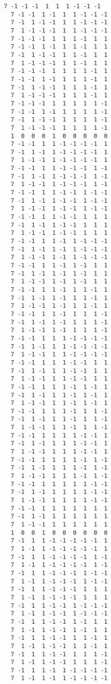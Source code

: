 \documentclass[%
  twocolumn,
 showpacs,
 showkeys,
 preprintnumbers,
 amsmath,amssymb,
 aps,
  pra,
  longbibliography,
 floatfix,
 ]{revtex4-1}
\begin{document}
{\begin{lstlisting}[backgroundcolor=\color{yellow!10},framerule=0pt,breaklines=true, frame=tb]
  7 -1 -1 -1  1  1  1 -1 -1 -1
  7 -1 -1  1 -1  1  1 -1 -1 -1
  7 -1  1 -1 -1  1  1 -1 -1 -1
  7  1 -1 -1 -1  1  1 -1 -1 -1
  7 -1 -1 -1  1  1  1 -1  1  1
  7 -1 -1  1 -1  1  1 -1  1  1
  7 -1  1 -1 -1  1  1 -1  1  1
  7  1 -1 -1 -1  1  1 -1  1  1
  7 -1 -1 -1  1  1  1  1 -1  1
  7 -1 -1  1 -1  1  1  1 -1  1
  7 -1  1 -1 -1  1  1  1 -1  1
  7  1 -1 -1 -1  1  1  1 -1  1
  7 -1 -1 -1  1  1  1  1  1 -1
  7 -1 -1  1 -1  1  1  1  1 -1
  7 -1  1 -1 -1  1  1  1  1 -1
  7  1 -1 -1 -1  1  1  1  1 -1
  1  0  0  0  1  0  0  0  0  0
  7 -1 -1  1  1 -1 -1 -1 -1  1
  7 -1  1 -1  1 -1 -1 -1 -1  1
  7  1 -1 -1  1 -1 -1 -1 -1  1
  7 -1 -1  1  1 -1 -1 -1  1 -1
  7 -1  1 -1  1 -1 -1 -1  1 -1
  7  1 -1 -1  1 -1 -1 -1  1 -1
  7 -1 -1  1  1 -1 -1  1 -1 -1
  7 -1  1 -1  1 -1 -1  1 -1 -1
  7  1 -1 -1  1 -1 -1  1 -1 -1
  7 -1 -1  1  1 -1 -1  1  1  1
  7 -1  1 -1  1 -1 -1  1  1  1
  7  1 -1 -1  1 -1 -1  1  1  1
  7 -1 -1  1  1 -1  1 -1 -1 -1
  7 -1  1 -1  1 -1  1 -1 -1 -1
  7  1 -1 -1  1 -1  1 -1 -1 -1
  7 -1 -1  1  1 -1  1 -1  1  1
  7 -1  1 -1  1 -1  1 -1  1  1
  7  1 -1 -1  1 -1  1 -1  1  1
  7 -1 -1  1  1 -1  1  1 -1  1
  7 -1  1 -1  1 -1  1  1 -1  1
  7  1 -1 -1  1 -1  1  1 -1  1
  7 -1 -1  1  1 -1  1  1  1 -1
  7 -1  1 -1  1 -1  1  1  1 -1
  7  1 -1 -1  1 -1  1  1  1 -1
  7 -1 -1  1  1  1 -1 -1 -1 -1
  7 -1  1 -1  1  1 -1 -1 -1 -1
  7  1 -1 -1  1  1 -1 -1 -1 -1
  7 -1 -1  1  1  1 -1 -1  1  1
  7 -1  1 -1  1  1 -1 -1  1  1
  7  1 -1 -1  1  1 -1 -1  1  1
  7 -1 -1  1  1  1 -1  1 -1  1
  7 -1  1 -1  1  1 -1  1 -1  1
  7  1 -1 -1  1  1 -1  1 -1  1
  7 -1 -1  1  1  1 -1  1  1 -1
  7 -1  1 -1  1  1 -1  1  1 -1
  7  1 -1 -1  1  1 -1  1  1 -1
  7 -1 -1  1  1  1  1 -1 -1  1
  7 -1  1 -1  1  1  1 -1 -1  1
  7  1 -1 -1  1  1  1 -1 -1  1
  7 -1 -1  1  1  1  1 -1  1 -1
  7 -1  1 -1  1  1  1 -1  1 -1
  7  1 -1 -1  1  1  1 -1  1 -1
  7 -1 -1  1  1  1  1  1 -1 -1
  7 -1  1 -1  1  1  1  1 -1 -1
  7  1 -1 -1  1  1  1  1 -1 -1
  7 -1 -1  1  1  1  1  1  1  1
  7 -1  1 -1  1  1  1  1  1  1
  7  1 -1 -1  1  1  1  1  1  1
  1  0  0  1  0  0  0  0  0  0
  7 -1  1  1 -1 -1 -1 -1 -1  1
  7  1 -1  1 -1 -1 -1 -1 -1  1
  7 -1  1  1 -1 -1 -1 -1  1 -1
  7  1 -1  1 -1 -1 -1 -1  1 -1
  7 -1  1  1 -1 -1 -1  1 -1 -1
  7  1 -1  1 -1 -1 -1  1 -1 -1
  7 -1  1  1 -1 -1 -1  1  1  1
  7  1 -1  1 -1 -1 -1  1  1  1
  7 -1  1  1 -1 -1  1 -1 -1 -1
  7  1 -1  1 -1 -1  1 -1 -1 -1
  7 -1  1  1 -1 -1  1 -1  1  1
  7  1 -1  1 -1 -1  1 -1  1  1
  7 -1  1  1 -1 -1  1  1 -1  1
  7  1 -1  1 -1 -1  1  1 -1  1
  7 -1  1  1 -1 -1  1  1  1 -1
  7  1 -1  1 -1 -1  1  1  1 -1
  7 -1  1  1 -1  1 -1 -1 -1 -1
  7  1 -1  1 -1  1 -1 -1 -1 -1

\end{lstlisting}}
\end{document}
